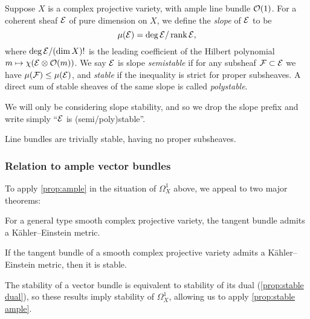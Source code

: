 \begin{definition}
    Suppose $X$ is a complex projective variety, with ample line bundle $\mathcal{O}(1)$.
    For a coherent sheaf $\mathcal{E}$ of pure dimension on $X$, we define the
    \emph{slope} of $\mathcal{E}$ to be
    \begin{equation*}
        \mu(\mathcal{E}) = \deg\mathcal{E} / \operatorname{rank}\mathcal{E},
    \end{equation*}
    where $\deg\mathcal{E}/(\dim X)!$ is the leading coefficient of the Hilbert
    polynomial $m\mapsto\chi(\mathcal{E}\otimes\mathcal{O}(m))$. We say $\mathcal{E}$ is slope
    \emph{semistable} if for any subsheaf $\mathcal{F}\subset\mathcal{E}$ we have
    $\mu(\mathcal{F})\le\mu(\mathcal{E})$, and \emph{stable} if the inequality is strict for
    proper subsheaves. A direct sum of stable sheaves of the same slope is
    called \emph{polystable}.
\end{definition}

We will only be considering slope stability, and so we drop the slope prefix and
write simply ``$\mathcal{E}$ is (semi/poly)stable''. 

\begin{remark}
    Line bundles are trivially stable, having no proper subsheaves.
\end{remark}

\subsubsection{Relation to ample vector bundles}

To apply \cref{prop:ample} in the situation of $\Omega^1_X$ above, we appeal to
two major theorems:

\begin{theorem}
    For a general type smooth complex projective variety, the tangent bundle
    admits a K\"ahler--Einstein metric.
\end{theorem}

\begin{theorem}
    If the tangent bundle of a smooth complex projective variety admits a
    K\"ahler--Einstein metric, then it is stable.
\end{theorem}

The stability of a vector bundle is equivalent to stability of its dual
(\cref{prop:stable dual}), so these results imply stability of $\Omega^1_X$,
allowing us to apply \cref{prop:stable ample}.


